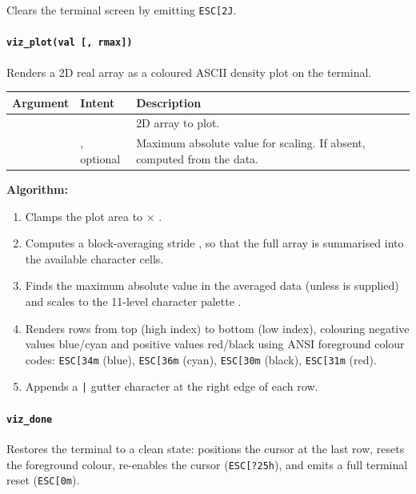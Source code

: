 Clears the terminal screen by emitting \texttt{ESC[2J}.

\paragraph{\texttt{viz\_plot(val [, rmax])}}

Renders a 2D real array as a coloured ASCII density plot on the terminal.

\begin{longtable}{L{3cm} L{3cm} L{8cm}}
  \toprule
  \textbf{Argument} & \textbf{Intent} & \textbf{Description} \\
  \midrule
  \endhead
  \bottomrule
  \endfoot
   &  & 2D  array to plot. \\
       & , optional & Maximum absolute value for
    scaling. If absent, computed from the data. \\
\end{longtable}

\textbf{Algorithm:}
\begin{enumerate}
  \item Clamps the plot area to  $\times$
        .
  \item Computes a block-averaging stride ,
         so that the full array is summarised
        into the available character cells.
  \item Finds the maximum absolute value in the averaged data (unless
         is supplied) and scales to the 11-level character
        palette .
  \item Renders rows from top (high index) to bottom (low index),
        colouring negative values blue/cyan and positive values
        red/black using ANSI foreground colour codes:
        \texttt{ESC[34m} (blue), \texttt{ESC[36m} (cyan),
        \texttt{ESC[30m} (black), \texttt{ESC[31m} (red).
  \item Appends a \texttt{|} gutter character at the right edge of each row.
\end{enumerate}

\paragraph{\texttt{viz\_done}}

Restores the terminal to a clean state: positions the cursor at the last row,
resets the foreground colour, re-enables the cursor (\texttt{ESC[?25h}),
and emits a full terminal reset (\texttt{ESC[0m}).

